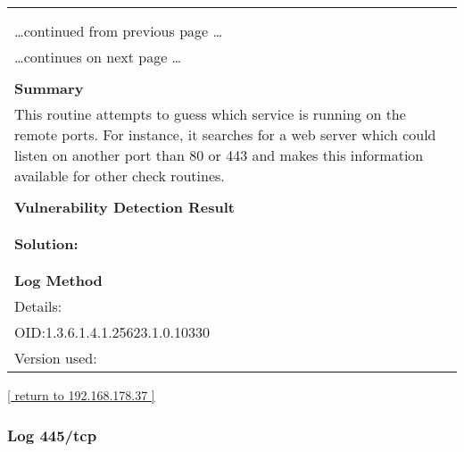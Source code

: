 \documentclass{article}
\begin{document}
\begin{longtable}{|p{}|}
\hline
\rowcolor{gvm_log}{\color{white}{Log (CVSS: 0.0) }}\\
\rowcolor{gvm_log}{\color{white}{NVT: Services}}\\
\hline
\endfirsthead
\hfill\ldots continued from previous page \ldots \\
\hline
\endhead
\hline
\ldots continues on next page \ldots \\
\endfoot
\hline
\endlastfoot
\\
\textbf{Summary}\\
This routine attempts to guess which service is running on the
  remote ports. For instance, it searches for a web server which could listen on another port than
  80 or 443 and makes this information available for other check routines.\\

        \hline
        \\
\textbf{Vulnerability Detection Result}\\
\rowcolor{white}{\verb=A web server is running on this port=}\\

          \hline
          \\
\textbf{Solution:}\\
\\


        \hline
        \\
\textbf{Log Method}\\
Details:
\rowcolor{white}{\verb=Services=}\\
OID:1.3.6.1.4.1.25623.1.0.10330\\
Version used:
\rowcolor{white}{\verb=2021-03-15T10:42:03Z=}\\
\end{longtable}

\begin{footnotesize}\hyperref[host:192.168.178.37]{[ return to 192.168.178.37 ]}\end{footnotesize}
\subsubsection{Log 445/tcp}
\label{port:192.168.178.37 445/tcp Log}
\end{document}

